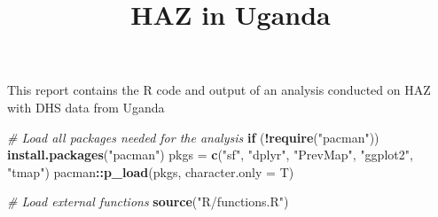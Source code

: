 \documentclass[11pt,]{article}
\title{HAZ in Uganda  }
\author{}
\date{}
\renewenvironment{abstract}
 {{%
    \setlength{\leftmargin}{0mm}
    \setlength{\rightmargin}{\leftmargin}%
  }%
  \relax}
 {\endlist}
\newenvironment{Shaded}{\begin{snugshade}}{\end{snugshade}}
\newcommand{\CommentTok}[1]{\textcolor[rgb]{0.56,0.35,0.01}{\textit{#1}}}
\newcommand{\ControlFlowTok}[1]{\textcolor[rgb]{0.13,0.29,0.53}{\textbf{#1}}}
\newcommand{\DataTypeTok}[1]{\textcolor[rgb]{0.13,0.29,0.53}{#1}}
\newcommand{\KeywordTok}[1]{\textcolor[rgb]{0.13,0.29,0.53}{\textbf{#1}}}
\newcommand{\NormalTok}[1]{#1}
\newcommand{\OperatorTok}[1]{\textcolor[rgb]{0.81,0.36,0.00}{\textbf{#1}}}
\newcommand{\StringTok}[1]{\textcolor[rgb]{0.31,0.60,0.02}{#1}}
\begin{document}
	
%

{%
\setlength{\parindent}{0pt}
\thispagestyle{plain}
{\fontsize{18}{20}\selectfont\raggedright 
\maketitle  %

}

{
   \vskip 13.5pt\relax \normalsize\fontsize{11}{12} 
 

}

}








\begin{abstract}

    \hbox{\vrule height .2pt width 39.14pc}

    \vskip 8.5pt %

\noindent This report contains the R code and output of an analysis conducted on
HAZ with DHS data from Uganda


    \hbox{\vrule height .2pt width 39.14pc}


\end{abstract}


\vskip 6.5pt


\noindent  \begin{Shaded}
\begin{Highlighting}[]
\CommentTok{# Load all packages needed for the analysis}
\ControlFlowTok{if}\NormalTok{ (}\OperatorTok{!}\KeywordTok{require}\NormalTok{(}\StringTok{"pacman"}\NormalTok{)) }\KeywordTok{install.packages}\NormalTok{(}\StringTok{"pacman"}\NormalTok{)}
\NormalTok{pkgs =}\StringTok{ }\KeywordTok{c}\NormalTok{(}\StringTok{"sf"}\NormalTok{, }\StringTok{"dplyr"}\NormalTok{, }\StringTok{"PrevMap"}\NormalTok{, }\StringTok{"ggplot2"}\NormalTok{, }\StringTok{"tmap"}\NormalTok{)}
\NormalTok{pacman}\OperatorTok{::}\KeywordTok{p_load}\NormalTok{(pkgs, }\DataTypeTok{character.only =}\NormalTok{ T)}

\CommentTok{# Load external functions}
\KeywordTok{source}\NormalTok{(}\StringTok{"R/functions.R"}\NormalTok{)}
\end{Highlighting}
\end{Shaded}
\end{document}
